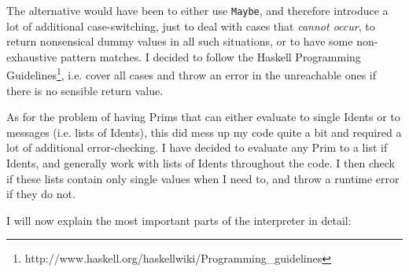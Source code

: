 \documentclass[a4paper]{article}
\begin{document}
The alternative would have been to either use \texttt{Maybe}, and therefore introduce a lot of additional case-switching, just to deal with cases that \emph{cannot occur}, to return nonsensical dummy values in all such situations, or to have some non-exhaustive pattern matches. I decided to follow the Haskell Programming Guidelines\footnote{http://www.haskell.org/haskellwiki/Programming\_guidelines}, i.e. cover all cases and throw an error in the unreachable ones if there is no sensible return value.

As for the problem of having Prims that can either evaluate to single Idents or to messages (i.e. lists of Idents), this did mess up my code quite a bit and required a lot of additional error-checking. I have decided to evaluate any Prim to a list if Idents, and generally work with lists of Idents throughout the code. I then check if these lists contain only single values when I need to, and throw a runtime error if they do not.

I will now explain the most important parts of the interpreter in detail:
\end{document}
